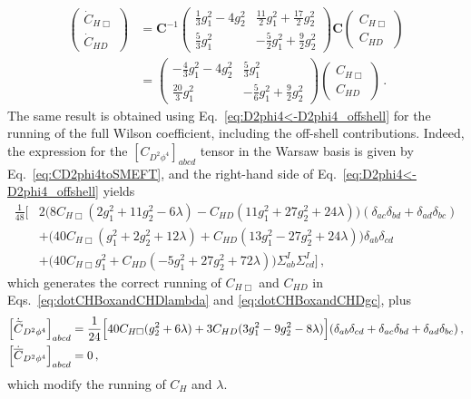 \begin{align}
    \begin{pmatrix}
    \dot C_{H\Box} \\ \dot C_{HD}
\end{pmatrix}
    &= \mathbf{C}^{-1}
    \begin{pmatrix}
    \frac{1}{3}g_1^2 - 4g_2^2 & \frac{11}{2}g_1^2+\frac{17}{2}g_2^2 \\
    \frac{5}{3}g_1^2 & -\frac{5}{2}g_1^2+\frac{9}{2}g_2^2
\end{pmatrix}
    \mathbf{C}
    \begin{pmatrix}
     C_{H\Box} \\  C_{HD}
    \end{pmatrix}
    \nonumber \\
    &=
    \begin{pmatrix}
    -\frac{4}{3}g_1^2 - 4g_2^2 & \frac{5}{3}g_1^2\\
    \frac{20}{3}g_1^2 & -\frac{5}{6}g_1^2+\frac{9}{2}g_2^2
    \end{pmatrix}
    \begin{pmatrix}
     C_{H\Box} \\  C_{HD}
    \end{pmatrix}\,.\label{eq:dotCHBoxandCHDgc}
\end{align}
The same result is obtained using Eq.~\eqref{eq:D2phi4<-D2phi4_offshell} for the running of the full Wilson coefficient, including the off-shell contributions.
Indeed, the expression for the $[C_{D^2\phi^4}]_{abcd}$ tensor in the Warsaw basis is given by Eq.~\eqref{eq:CD2phi4toSMEFT},
and the right-hand side of Eq.~\eqref{eq:D2phi4<-D2phi4_offshell} yields
\begin{align}
    \frac{1}{48}\Big[&
    2\Big(
    8C_{H\Box}(2g_1^2+11g_2^2-6\lambda)-C_{HD}(11g_1^2+27g_2^2+24\lambda)
    \Big)(\delta_{ac}\delta_{bd}+\delta_{ad}\delta_{bc})\nonumber \\
    &+ \Big(40 C_{H\Box}(g_1^2+2g_2^2+12\lambda)
    +C_{HD}(13g_1^2-27g_2^2+24\lambda)
    \Big)\delta_{ab}\delta_{cd}\nonumber \\
    &+
    \Big(
    40 C_{H\Box}g_1^2
    +C_{HD}(-5g_1^2+27g_2^2+72\lambda)
    \Big)\Sigma^I_{ab}\Sigma^I_{cd}
    \Big]\,,
\end{align}
which generates the correct running of $C_{H\Box}$ and $C_{HD}$ in Eqs.~\eqref{eq:dotCHBoxandCHDlambda} and \eqref{eq:dotCHBoxandCHDgc}, plus
\begin{align}
    \left[\dot{\widetilde{C}}_{D^2\phi^4}\right]_{abcd} &= 
    \frac{1}{24}\Big[
    40 C_{H\Box}(g_2^2+6\lambda)+3C_{HD}(3g_1^2 -9g_2^2-8\lambda)
    \Big](\delta_{ab}\delta_{cd}+\delta_{ac}\delta_{bd}+\delta_{ad}\delta_{bc})\,,\label{eq:dotCtildeSMEFT}\\
    \left[\dot{\overline C}_{D^2\phi^4}\right]_{abcd} &=0\label{eq:dotCbarSMEFT}\,,
\end{align}
which modify the running of $C_H$ and $\lambda$.

